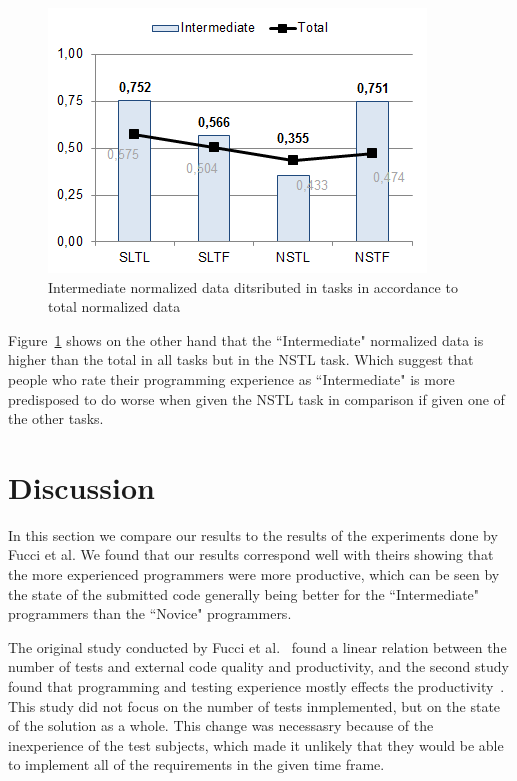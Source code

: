 \documentclass{sig-alternate-05-2015}
\begin{document}
\begin{figure}[!ht]
	\centering
	\includegraphics[width=1\linewidth]{img12}
	\caption{Intermediate normalized data ditsributed in tasks in accordance to total normalized data}
	\label{fig:Intermediate normalized data ditsributed in tasks in accordance to total normalized data}
\end{figure}

Figure~\ref{fig:Intermediate normalized data ditsributed in tasks in accordance to total normalized data} shows on the other hand that the ``Intermediate" normalized data is higher than the total in all tasks but in the NSTL task. Which suggest that people who rate their programming experience as ``Intermediate" is more predisposed to do worse when given the NSTL task in comparison if given one of the other tasks.


\section{Discussion}
\label{sec:Discussion}
In this section we compare our results to the results of the experiments done by Fucci et al. We found that our results correspond well with theirs showing that the more experienced programmers were more productive, which can be seen by the state of the submitted code generally being better for the ``Intermediate" programmers than the  ``Novice" programmers.

The original study conducted by Fucci et al.~\cite{fucci2} found a linear relation between the number of tests and external code quality and productivity, and the second study found that programming and testing experience mostly effects the productivity~\cite{fucci1}. This study did not focus on the number of tests inmplemented, but on the state of the solution as a whole. This change was necessasry because of the inexperience of the test subjects, which made it unlikely that they would be able to implement all of the requirements in the given time frame.
\end{document}

